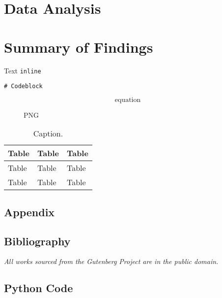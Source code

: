 \documentclass[a4paper]{article}
\begin{document}
\section{Data Analysis}

\section{Summary of Findings}

Text \lstinline$inline$
\begin{lstlisting}
# Codeblock
\end{lstlisting}
\begin{equation}
\text{equation}
\end{equation}

\begin{figure}[h]
\caption{PNG}
\label{fig:png}
\end{figure}

\begin{table}[h!]
\centering
\begin{tabular}{lll}
\hline
Table & Table & Table\\ \hline
Table & Table & Table \\
Table & Table & Table \\
\end{tabular}
\caption{\label{tab:table}Caption.}
\end{table}
\newpage
\begin{appendix}
\section{Appendix}
\subsection{Bibliography}
\emph{All works sourced from the Gutenberg Project are in the public domain.}


\subsection{Python Code}\label{sec:python}

\end{appendix}
\end{document}
